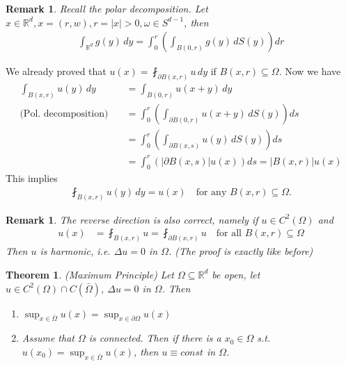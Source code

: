 \documentclass{report}
\theoremstyle{tommy}
\newtheorem{thm}[defn]{Theorem}
\newtheorem{rem}[defn]{Remark}
\begin{document}
\begin{rem}
  Recall the polar decomposition. Let \(x \in \mathbb{R}^d, x = (r,w), r = |x| > 0, \omega \in S^{d-1}\), then
  \begin{align*}
    \int_{\mathbb{R}^d} g(y) \, dy = \int_0^r \left(\int_{B(0, r)} g(y) \, dS(y) \right) dr
  \end{align*}
\end{rem}

We already proved that \( u(x) = \fint_{\partial B(x,r)} u \, dy \) if \(B(x,r) \subseteq \Omega\). Now we have 
\begin{align*}
  \int_{B(x, r)} u(y) \, dy 
  &= \int_{B(0, r)} u(x+y) \, dy \\
  \text{(Pol. decomposition)} \quad &= \int_0^r \left(\int_{\partial B(0, r)} u(x+y) \, dS(y)\right) ds \\
  &= \int_0^r \left(\int_{\partial B(x, s)} u(y) \, dS(y) \right) ds \\
  &= \int_0^r \left(|\partial B(x, s)| u(x) \right) ds
  = |B(x,r)| u(x)
\end{align*}
This implies
\begin{align*}
  \fint_{B(x,r)} u(y) \, dy = u(x)
  \quad \text{for any \(B(x,r) \subseteq \Omega\).}
\end{align*}

\begin{rem}
  The reverse direction is also correct, namely if \(u \in C^2(\Omega)\) and
  \begin{align*}
    u(x) 
    &= \fint_{B(x, r)} u
    = \fint_{\partial B(x,r)} u
    \quad \text{for all } B(x,r) \subseteq \Omega
  \end{align*}
  Then \(u\) is harmonic, i.e. \(\Delta u = 0\) in \(\Omega\). (The proof is exactly like before)
\end{rem}

\begin{thm} (Maximum Principle)
  Let \(\Omega \subseteq \mathbb{R}^d\) be open, let \(u \in C^2(\Omega) \cap C(\bar \Omega)\), \(\Delta u = 0\) in \(\Omega\). Then
  \begin{enumerate}
    \item \(\sup_{x \in \bar \Omega} u(x) = \sup_{x \in \partial \Omega} u(x)\)
    \item Assume that \(\Omega\) is connected. Then if there is a \(x_0 \in \Omega\) s.t. \( u(x_0) = \sup_{x \in \bar \Omega} u(x)\), then \( u \equiv const\) in \(\Omega\).
  \end{enumerate}
\end{thm}
\end{document}
